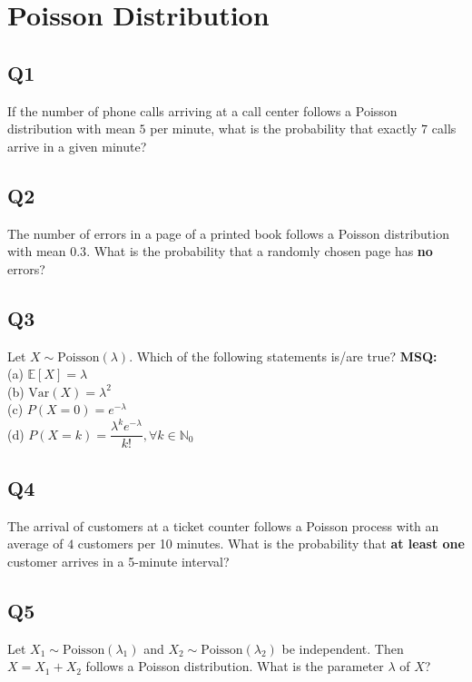 \section{Poisson Distribution}

\subsection*{Q1}
If the number of phone calls arriving at a call center follows a Poisson distribution with mean $5$ per minute, what is the probability that exactly $7$ calls arrive in a given minute?

\subsection*{Q2}
The number of errors in a page of a printed book follows a Poisson distribution with mean $0.3$. What is the probability that a randomly chosen page has \textbf{no} errors?

\subsection*{Q3}
Let $X \sim \text{Poisson}(\lambda)$. Which of the following statements is/are true?  
\textbf{MSQ:}  \\
(a) $\mathbb{E}[X] = \lambda$  \\
(b) $\text{Var}(X) = \lambda^2$  \\
(c) $P(X = 0) = e^{-\lambda}$  \\
(d) $P(X = k) = \dfrac{\lambda^k e^{-\lambda}}{k!}, \forall k \in \mathbb{N}_0$\\

\subsection*{Q4}
The arrival of customers at a ticket counter follows a Poisson process with an average of $4$ customers per 10 minutes. What is the probability that \textbf{at least one} customer arrives in a 5-minute interval?

\subsection*{Q5}
Let $X_1 \sim \text{Poisson}(\lambda_1)$ and $X_2 \sim \text{Poisson}(\lambda_2)$ be independent. Then $X = X_1 + X_2$ follows a Poisson distribution. What is the parameter $\lambda$ of $X$?

